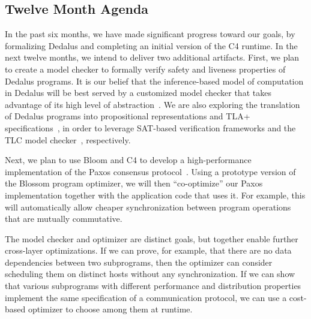 
\subsection{Twelve Month Agenda}

In the past six months, we have made significant progress toward our goals, by
formalizing Dedalus and completing an initial version of the C4 runtime. In the
next twelve months, we intend to deliver two additional artifacts. First, we
plan to create a model checker to formally verify safety and liveness properties
of Dedalus programs.  It is our belief that the inference-based model of
computation in Dedalus will be best served by a customized model checker that
takes advantage of its high level of abstraction~\cite{cardan, armc}.  We are
also exploring the translation of Dedalus programs into propositional
representations and TLA+ specifications~\cite{tla}, in order to leverage
SAT-based verification frameworks and the TLC model checker~\cite{tlc},
respectively.

Next, we plan to use Bloom and C4 to develop a high-performance implementation
of the Paxos consensus protocol~\cite{netdb,part-time}. Using a prototype version of the
Blossom program optimizer, we will then ``co-optimize'' our Paxos implementation
together with the application code that uses it. For example, this will
automatically allow cheaper synchronization between program operations that are
mutually commutative.

The model checker and optimizer are distinct goals, but together enable further
cross-layer optimizations.  If we can prove, for example, that there are no data
dependencies between two subprograms, then the optimizer can consider scheduling
them on distinct hosts without any synchronization.  If we can show that various
subprograms with different performance and distribution properties implement the
same specification of a communication protocol, we can use a cost-based
optimizer to choose among them at runtime.
